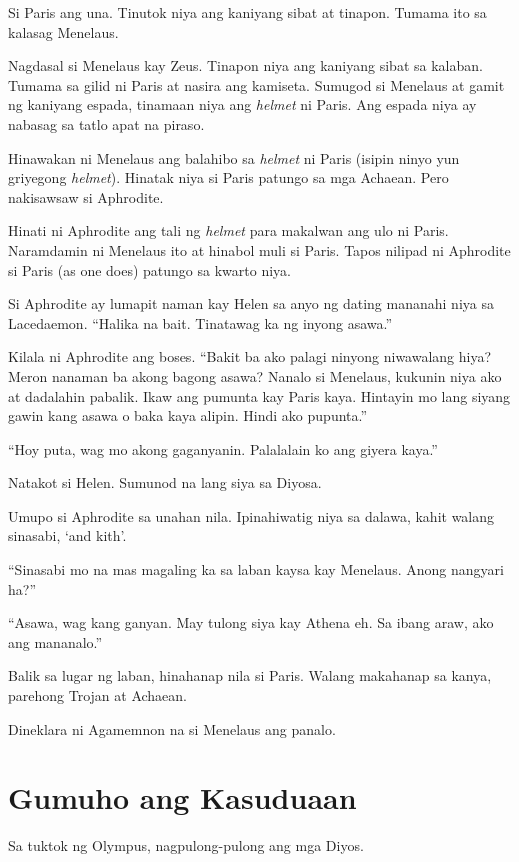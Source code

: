 \documentclass[12pt,letterpaper]{report}
\begin{document}
Si Paris ang una. Tinutok niya ang kaniyang sibat at tinapon. Tumama ito sa kalasag Menelaus.

Nagdasal si Menelaus kay Zeus. Tinapon niya ang kaniyang sibat sa kalaban. Tumama sa gilid ni Paris at nasira ang kamiseta. Sumugod si Menelaus at gamit ng kaniyang espada, tinamaan niya ang \textit{helmet} ni Paris. Ang espada niya ay nabasag sa tatlo apat na piraso.

Hinawakan ni Menelaus ang balahibo sa \textit{helmet} ni Paris (isipin ninyo yun griyegong \textit{helmet}). Hinatak niya si Paris patungo sa mga Achaean. Pero nakisawsaw si Aphrodite.

Hinati ni Aphrodite ang tali ng \textit{helmet} para makalwan ang ulo ni Paris. Naramdamin ni Menelaus ito at hinabol muli si Paris. Tapos nilipad ni Aphrodite si Paris (as one does) patungo sa kwarto niya.

Si Aphrodite ay lumapit naman kay Helen sa anyo ng dating mananahi niya sa Lacedaemon. ``Halika na bait. Tinatawag ka ng inyong asawa.''

Kilala ni Aphrodite ang boses. ``Bakit ba ako palagi ninyong niwawalang hiya? Meron nanaman ba akong bagong asawa? Nanalo si Menelaus, kukunin niya ako at dadalahin pabalik. Ikaw ang pumunta kay Paris kaya. Hintayin mo lang siyang gawin kang asawa o baka kaya alipin. Hindi ako pupunta.''

``Hoy puta, wag mo akong gaganyanin. Palalalain ko ang giyera kaya.''

Natakot si Helen. Sumunod na lang siya sa Diyosa.

Umupo si Aphrodite sa unahan nila. Ipinahiwatig niya sa dalawa, kahit walang sinasabi, `and kith'.

``Sinasabi mo na mas magaling ka sa laban kaysa kay Menelaus. Anong nangyari ha?''

``Asawa, wag kang ganyan. May tulong siya kay Athena eh. Sa ibang araw, ako ang mananalo.''

Balik sa lugar ng laban, hinahanap nila si Paris. Walang makahanap sa kanya, parehong Trojan at Achaean.

Dineklara ni Agamemnon na si Menelaus ang panalo.


\pagebreak
\chapter{Gumuho ang Kasuduaan}

Sa tuktok ng Olympus, nagpulong-pulong ang mga Diyos.
\end{document}
